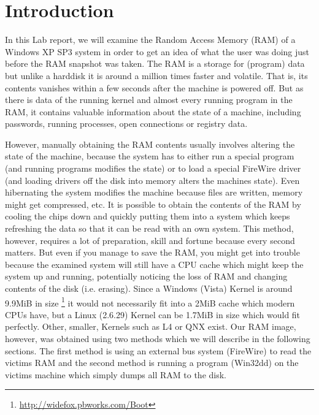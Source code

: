 \documentclass[a4paper,
    11pt,
    normalheadings,
    parindent,
    UKenglish,
    abstracton,
    ]{scrartcl}
\title{\mytitle{}}
\author{
    cand. Dipl. Inf. Tobias Müller <\href{mailto:muellet2@computing.dcu.ie?subject=ss10-forensic-lab01}{muellet2@}>, 59212333 \and
    BSc. Anthony Walters <\href{mailto:waltera3@computing.dcu.ie?subject=ss10-forensic-lab01}{waltera3@}>, 59213102
    }
\date{\today}
\begin{document}
\maketitle


\section{Introduction}
In this Lab report, we will examine the Random Access Memory (RAM) of a Windows XP SP3 system in order to get an idea of what the user was doing just before the RAM snapshot was taken.
The RAM is a storage for (program) data but unlike a harddisk it is around a million times faster and volatile.
That is, its contents vanishes within a few seconds after the machine is powered off.
But as there is data of the running kernel and almost every running program in the RAM, it contains valuable information about the state of a machine, including passwords, running processes, open connections or registry data.

However, manually obtaining the RAM contents usually involves altering the state of the machine, because the system has to either run a special program (and running programs modifies the state) or to load a special FireWire driver (and loading drivers off the disk into memory alters the machines state).
Even hibernating the system modifies the machine because files are written, memory might get compressed, etc.
It is possible to obtain the contents of the RAM by cooling the chips down and quickly putting them into a system which keeps refreshing the data so that it can be read with an own system.
This method, however, requires a lot of preparation, skill and fortune because every second matters.
But even if you manage to save the RAM, you might get into trouble because the examined system will still have a CPU cache which might keep the system up and running, potentially noticing the loss of RAM and changing contents of the disk (i.e. erasing).
Since a Windows (Vista) Kernel is around 9.9MiB in size%
\footnote{\url{http://widefox.pbworks.com/Boot}} it would not necessarily fit into a 2MiB cache which modern CPUs have, but a Linux (2.6.29) Kernel can be 1.7MiB in size which would fit perfectly.
Other, smaller, Kernels such as L4 or QNX exist.
Our RAM image, however, was obtained using two methods which we will describe in the following sections.
The first method is using an external bus system (FireWire) to read the victims RAM and the second method is running a program (Win32dd) on the victims machine which simply dumps all RAM to the disk.
\end{document}
